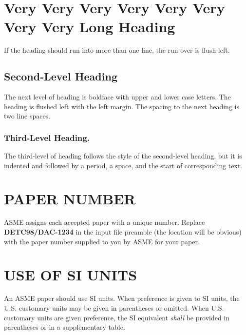 \documentclass[twocolumn,10pt]{asme2e}
\begin{document}
\section*{Very Very Very Very Very Very Very Very Long Heading}

If the heading should run into more than one line, the run-over is flush left.

\subsection*{Second-Level Heading}

The next level of heading is boldface with upper and lower case letters.
The heading is flushed left with the left margin.
The spacing to the next heading is two line spaces.

\subsubsection*{Third-Level Heading.}

The third-level of heading follows the style of the second-level heading, but it is indented and followed by a period, a space, and the start of corresponding text.

\section*{PAPER NUMBER}

ASME assigns each accepted paper with a unique number.
Replace {\bf DETC98/DAC-1234} in the input file preamble (the location will be obvious) with the paper number supplied to you by ASME for your paper.


\section*{USE OF SI UNITS}

An ASME paper should use SI units.
When preference is given to SI units, the U.S. customary units may be given in parentheses or omitted.
When U.S. customary units are given preference, the SI equivalent {\em shall} be provided in parentheses or in a supplementary table.
\end{document}

